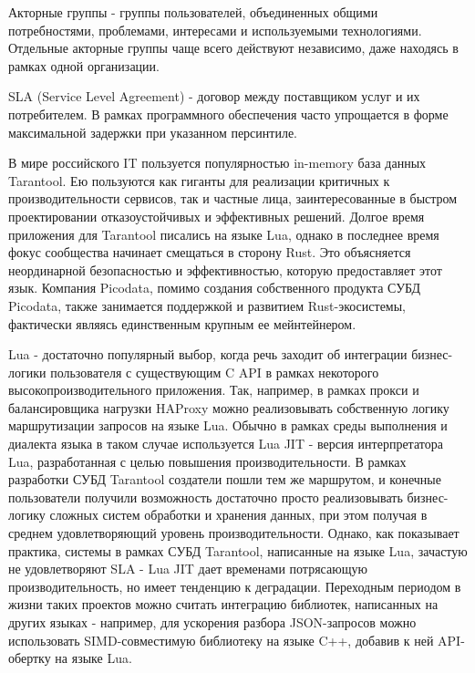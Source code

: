 \documentclass[times,numbers=noenddot]{itmo-student-thesis}
\begin{document}
Акторные группы - группы пользователей, объединенных общими потребностями, проблемами, интересами и используемыми технологиями.
Отдельные акторные группы чаще всего действуют независимо, даже находясь в рамках одной организации.

SLA (Service Level Agreement) - договор между поставщиком услуг и их потребителем.
В рамках программного обеспечения часто упрощается в форме максимальной задержки при указанном персинтиле.


\startprefacepage

В мире российского IT пользуется популярностью in-memory база данных Tarantool.
Ею пользуются как гиганты для реализации критичных к производительности сервисов, так и частные лица, заинтересованные в быстром проектировании отказоустойчивых и эффективных решений.
Долгое время приложения для Tarantool писались на языке Lua, однако в последнее время фокус сообщества начинает смещаться в сторону Rust.
Это объясняется неординарной безопасностью и эффективностью, которую предоставляет этот язык.
Компания Picodata, помимо создания собственного продукта СУБД Picodata, также занимается поддержкой и развитием Rust-экосистемы, фактически являясь единственным крупным ее мейнтейнером.

Lua - достаточно популярный выбор, когда речь заходит об интеграции бизнес-логики пользователя с существующим C API в рамках некоторого высокопроизводительного приложения.
Так, например, в рамках прокси и балансировщика нагрузки HAProxy можно реализовывать собственную логику маршрутизации запросов на языке Lua.
Обычно в рамках среды выполнения и диалекта языка в таком случае используется Lua JIT - версия интерпретатора Lua, разработанная с целью повышения производительности.
В рамках разработки СУБД Tarantool создатели пошли тем же маршрутом, и конечные пользователи получили возможность достаточно просто реализовывать бизнес-логику сложных систем обработки и хранения данных, при этом получая в среднем удовлетворяющий уровень производительности.
Однако, как показывает практика, системы в рамках СУБД Tarantool, написанные на языке Lua, зачастую не удовлетворяют SLA - Lua JIT дает временами потрясающую производительность, но имеет тенденцию к деградации.
Переходным периодом в жизни таких проектов можно считать интеграцию библиотек, написанных на других языках - например, для ускорения разбора JSON-запросов можно использовать SIMD-совместимую библиотеку на языке C++, добавив к ней API-обертку на языке Lua.
\end{document}
